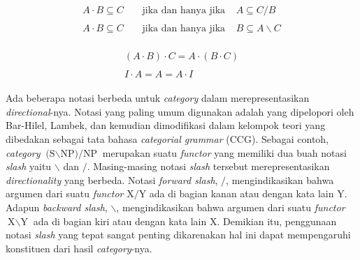 \begin{align}
  \begin{split}\label{catg:syn:4}
    A \cdot B \subseteq C & \;\;\;\;\text{jika dan hanya jika}\;\;\;\; A \subseteq C/B
  \end{split}\\
  \begin{split}\label{catg:syn:5}
    A \cdot B \subseteq C & \;\;\;\;\text{jika dan hanya jika}\;\;\;\; B \subseteq A\backslash{}C
  \end{split}
\end{align}

\begin{align}
  \begin{split}\label{catg:syn:6}
    (A \cdot B) \cdot C = A \cdot (B \cdot C)
  \end{split}\\
  \begin{split}\label{catg:syn:7}
    I \cdot A = A = A \cdot I
  \end{split}
\end{align}

Ada beberapa notasi berbeda untuk \textit{category} dalam merepresentasikan \textit{directional}-nya.
Notasi yang paling umum digunakan adalah  yang dipelopori oleh Bar-Hilel,
Lambek, dan kemudian dimodifikasi dalam kelompok teori yang dibedakan sebagai tata bahasa
 \textit{categorial grammar} (CCG).
Sebagai contoh, \textit{category} $\text{(S$\backslash$NP)/NP}$ merupakan suatu \textit{functor} yang
memiliki dua buah notasi \textit{slash} yaitu $\backslash$ dan $/$.
Masing-masing notasi \textit{slash} tersebut merepresentasikan \textit{directionality} yang berbeda.
Notasi \textit{forward slash}, $/$, mengindikasikan bahwa argumen dari suatu \textit{functor}
$\text{X}/\text{Y}$ ada di bagian kanan atau dengan kata lain $\text{Y}$.
Adapun \textit{backward slash}, $\backslash$, mengindikasikan bahwa argumen dari suatu \textit{functor}
$\text{X}\backslash\text{Y}$ ada di bagian kiri atau dengan kata lain $\text{X}$.
Demikian itu, penggunaan notasi \textit{slash} yang tepat sangat penting dikarenakan hal ini dapat
mempengaruhi konstituen dari hasil  \textit{category}-nya.


